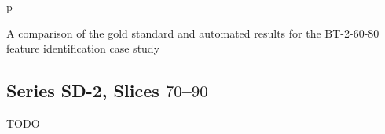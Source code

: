 \begin{stusubfig}{p}
	\hspace{4mm}%
\caption{A comparison of the gold standard and automated results for the BT-2-60-80 feature identification case study}
\label{fig:validation-BT-2-60-80}
\end{stusubfig}

\subsection{Series SD-2, Slices $70$--$90$}

TODO

